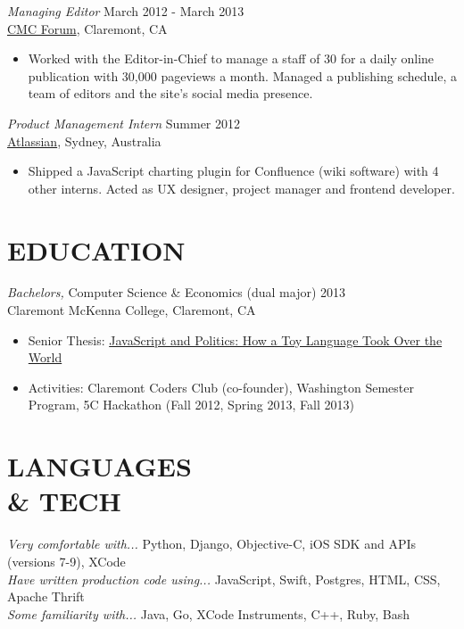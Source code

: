 \documentclass[margin, 10pt]{res}
\begin{document}
\begin{resume}
\begin{flushleft}
{\sl Managing Editor} \hfill March 2012 - March 2013 \\
\href{http://cmcforum.com/}{CMC Forum}, Claremont, CA
\begin{itemize}
\item Worked with the Editor-in-Chief to manage a staff of 30 for a daily online publication with 30,000 pageviews a month. Managed a publishing schedule, a team of editors and the site's social media presence.
\end{itemize}

{\sl Product Management Intern} \hfill Summer 2012 \\
\href{https://www.atlassian.com/}{Atlassian}, Sydney, Australia
\begin{itemize}
\item Shipped a JavaScript charting plugin for Confluence (wiki software) with 4 other interns. Acted as UX designer, project manager and frontend developer.
\end{itemize}


\section{EDUCATION}

{\sl Bachelors,} Computer Science \& Economics (dual major) \hfill 2013 \\
Claremont McKenna College, Claremont, CA
\begin{itemize} \itemsep -1pt %
\item Senior Thesis: \href{https://github.com/s-mcqueen/js_and_politics/blob/master/final_draft/FINAL.pdf}{JavaScript and Politics: How a Toy Language Took Over the World}
\item Activities: Claremont Coders Club (co-founder), Washington Semester Program, 5C Hackathon (Fall 2012, Spring 2013, Fall 2013)
\end{itemize}


\section{LANGUAGES \\ \& TECH }
{\sl Very comfortable with...} Python, Django, Objective-C, iOS SDK and APIs (versions 7-9), XCode \\
{\sl Have written production code using...} JavaScript, Swift, Postgres, HTML, CSS, Apache Thrift \\
{\sl Some familiarity with...} Java, Go, XCode Instruments, C++, Ruby, Bash


\end{flushleft}
\end{resume}
\end{document}
